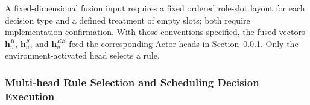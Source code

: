 A fixed-dimensional fusion input requires a fixed ordered role-slot layout for each decision type
and a defined treatment of empty slots; both require implementation confirmation.
With those conventions specified, the fused vectors $\boldsymbol h_n^R$,
$\boldsymbol h_n^S$, and $\boldsymbol h_n^{RE}$ feed the corresponding Actor heads in
Section~\ref{subsubsec:rule_execution}. Only the environment-activated head selects a rule.


\subsubsection{Multi-head Rule Selection and Scheduling Decision Execution}
\label{subsubsec:rule_execution}


